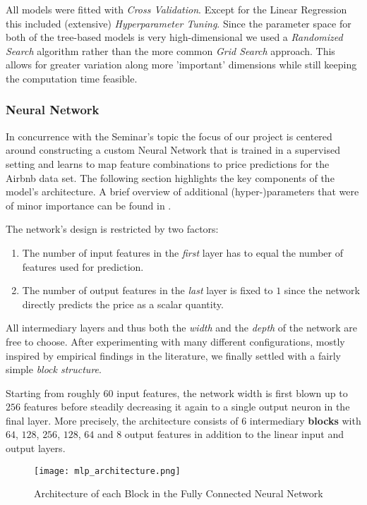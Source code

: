 All models were fitted with \emph{Cross Validation}.
Except for the Linear Regression this included (extensive) \emph{Hyperparameter Tuning}.
Since the parameter space for both of the tree-based models is very high-dimensional we used a \emph{Randomized Search} algorithm \citep{bergstra2012} rather than the more common \emph{Grid Search} approach.
This allows for greater variation along more 'important' dimensions while still keeping the computation time feasible.


\subsubsection{Neural Network} \label{neural-network}

In concurrence with the Seminar's topic the focus of our project is centered around constructing a custom Neural Network that is trained in a supervised setting and learns to map feature combinations to price predictions for the Airbnb data set.
The following section highlights the key components of the model's architecture.
A brief overview of additional (hyper-)parameters that were of minor importance can be found in .

The network's design is restricted by two factors:
\begin{enumerate}
  \item The number of input features in the \emph{first} layer has to equal the number of features used for prediction.
  \item The number of output features in the \emph{last} layer is fixed to $1$ since the network directly predicts the price as a scalar quantity.
\end{enumerate}
All intermediary layers and thus both the \emph{width} and the \emph{depth} of the network are free to choose.
After experimenting with many different configurations, mostly inspired by empirical findings in the literature, we finally settled with a fairly simple \emph{block structure}.

Starting from roughly $60$ input features, the network width is first blown up to $256$ features before steadily decreasing it again to a single output neuron in the final layer.
More precisely, the architecture consists of $6$ intermediary \textbf{blocks} with $64$, $128$, $256$, $128$, $64$ and $8$ output features in addition to the linear input and output layers.

\begin{figure}[t]
  \centering
  \texttt{[image: mlp\_architecture.png]}
  \caption{Architecture of each Block in the Fully Connected Neural Network}
  \label{fig:linear-block}
\end{figure}

